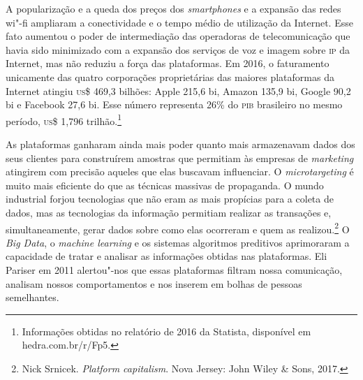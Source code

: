 \textls[-10]A popularização e a queda dos preços dos \emph{smartphones} e a expansão das redes wi"-fi ampliaram a conectividade e o tempo médio de utilização da Internet. Esse fato aumentou o poder de intermediação das operadoras de telecomunicação que havia sido minimizado com a expansão dos serviços de voz e imagem sobre \textsc{ip} da Internet, mas não reduziu a força das plataformas. Em 2016, o faturamento unicamente das quatro corporações proprietárias das maiores plataformas da Internet atingiu \textsc{us}\$ 469,3 bilhões: Apple 215,6 bi, Amazon 135,9 bi, Google 90,2 bi e Facebook 27,6 bi. Esse número representa 26\% do \textsc{pib} brasileiro no mesmo período, \textsc{us}\$ 1,796 trilhão.\footnote{Informações obtidas no relatório de 2016 da Statista, disponível em hedra.com.br/r/Fp5.}

As plataformas ganharam ainda mais poder quanto mais armazenavam dados
dos seus clientes para construírem amostras que permitiam às empresas de
\emph{marketing} atingirem com precisão aqueles que elas buscavam influenciar.
O \emph{microtargeting} é muito mais eficiente do que as técnicas massivas de
propaganda. O mundo industrial forjou tecnologias que não eram as mais
propícias para a coleta de dados, mas as tecnologias da informação
permitiam realizar as transações e, simultaneamente, gerar dados sobre
como elas ocorreram e quem as realizou.\footnote{Nick Srnicek. \emph{Platform capitalism}. Nova Jersey: John Wiley \& Sons, 2017.} O \emph{Big Data},
o \emph{machine learning} e os sistemas algoritmos preditivos aprimoraram a
capacidade de tratar e analisar as informações obtidas nas plataformas.
Eli Pariser em 2011 alertou"-nos que essas plataformas filtram nossa
comunicação, analisam nossos comportamentos e nos inserem em bolhas de
pessoas semelhantes.


